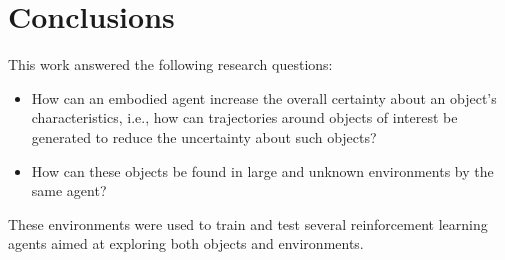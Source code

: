 \section{Conclusions}\label{sec:conclusions}
    This work answered the following research questions:
    \begin{itemize}
      \item How can an embodied agent increase the overall certainty about an object's characteristics, i.e., how can trajectories around objects of interest be generated to reduce the uncertainty about such objects? 
      \item How can these objects be found in large and unknown environments by the same agent?
    \end{itemize}
   

These environments were used to train and test several reinforcement learning agents aimed at exploring both objects and environments.



